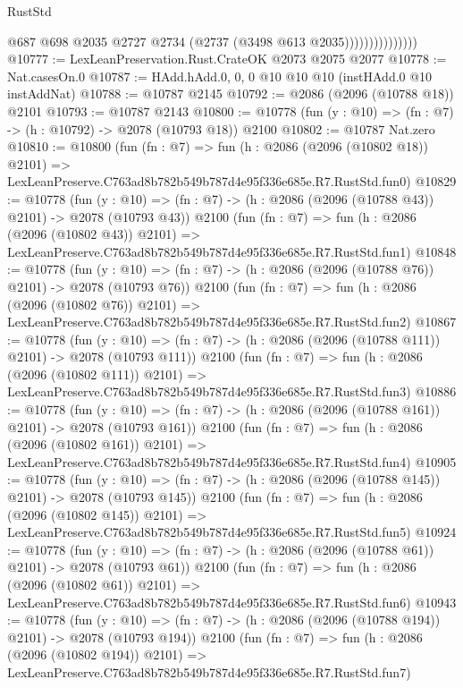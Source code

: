 \begin{lexlean}{RustStd}
\begin{coremodule}
                              @687
                              @698
                              @2035
                              @2727
                              @2734
                              (@2737 (@3498 @613 @2035)))))))))))))))
@10777 := LexLeanPreservation.Rust.CrateOK @2073 @2075 @2077
@10778 := Nat.casesOn.{0}
@10787 := HAdd.hAdd.{0, 0, 0} @10 @10 @10 (instHAdd.{0} @10 instAddNat)
@10788 := @10787 @2145
@10792 := @2086 (@2096 (@10788 @18)) @2101
@10793 := @10787 @2143
@10800 := @10778 (fun (y : @10) => (fn : @7) -> (h : @10792) -> @2078 (@10793 @18)) @2100
@10802 := @10787 Nat.zero
@10810 := @10800
    (fun (fn : @7) =>
    fun (h : @2086 (@2096 (@10802 @18)) @2101) =>
    LexLeanPreserve.C763ad8b782b549b787d4e95f336e685e.R7.RustStd.fun0)
@10829 := @10778
    (fun (y : @10) => (fn : @7) -> (h : @2086 (@2096 (@10788 @43)) @2101) -> @2078 (@10793 @43))
    @2100
    (fun (fn : @7) =>
    fun (h : @2086 (@2096 (@10802 @43)) @2101) =>
    LexLeanPreserve.C763ad8b782b549b787d4e95f336e685e.R7.RustStd.fun1)
@10848 := @10778
    (fun (y : @10) => (fn : @7) -> (h : @2086 (@2096 (@10788 @76)) @2101) -> @2078 (@10793 @76))
    @2100
    (fun (fn : @7) =>
    fun (h : @2086 (@2096 (@10802 @76)) @2101) =>
    LexLeanPreserve.C763ad8b782b549b787d4e95f336e685e.R7.RustStd.fun2)
@10867 := @10778
    (fun (y : @10) => (fn : @7) -> (h : @2086 (@2096 (@10788 @111)) @2101) -> @2078 (@10793 @111))
    @2100
    (fun (fn : @7) =>
    fun (h : @2086 (@2096 (@10802 @111)) @2101) =>
    LexLeanPreserve.C763ad8b782b549b787d4e95f336e685e.R7.RustStd.fun3)
@10886 := @10778
    (fun (y : @10) => (fn : @7) -> (h : @2086 (@2096 (@10788 @161)) @2101) -> @2078 (@10793 @161))
    @2100
    (fun (fn : @7) =>
    fun (h : @2086 (@2096 (@10802 @161)) @2101) =>
    LexLeanPreserve.C763ad8b782b549b787d4e95f336e685e.R7.RustStd.fun4)
@10905 := @10778
    (fun (y : @10) => (fn : @7) -> (h : @2086 (@2096 (@10788 @145)) @2101) -> @2078 (@10793 @145))
    @2100
    (fun (fn : @7) =>
    fun (h : @2086 (@2096 (@10802 @145)) @2101) =>
    LexLeanPreserve.C763ad8b782b549b787d4e95f336e685e.R7.RustStd.fun5)
@10924 := @10778
    (fun (y : @10) => (fn : @7) -> (h : @2086 (@2096 (@10788 @61)) @2101) -> @2078 (@10793 @61))
    @2100
    (fun (fn : @7) =>
    fun (h : @2086 (@2096 (@10802 @61)) @2101) =>
    LexLeanPreserve.C763ad8b782b549b787d4e95f336e685e.R7.RustStd.fun6)
@10943 := @10778
    (fun (y : @10) => (fn : @7) -> (h : @2086 (@2096 (@10788 @194)) @2101) -> @2078 (@10793 @194))
    @2100
    (fun (fn : @7) =>
    fun (h : @2086 (@2096 (@10802 @194)) @2101) =>
    LexLeanPreserve.C763ad8b782b549b787d4e95f336e685e.R7.RustStd.fun7)

\end{coremodule}
\end{lexlean}
